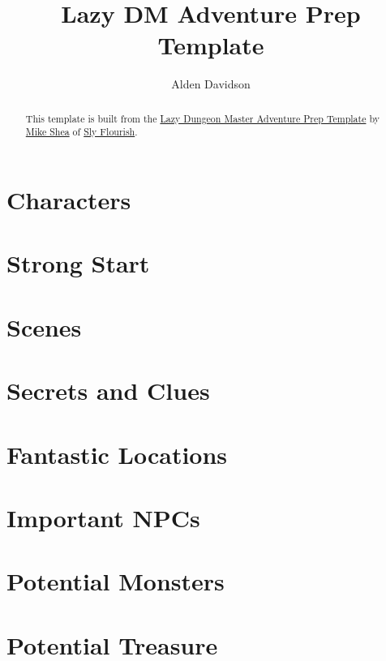\documentclass[a4paper,11pt]{article}
\title{Lazy DM Adventure Prep Template}
\author{Alden Davidson}
\begin{document}
\maketitle
\tableofcontents

\begin{abstract}
  This template is built from the
  \href{https://slyflourish.com/rotldm_template.html}{Lazy Dungeon Master Adventure Prep Template} by
  \href{https://slyflourish.com/about_mike_shea.html}{Mike Shea} of \href{https://slyflourish.com/}{Sly Flourish}.
\end{abstract}

\pagebreak
\section*{Characters}
\label{sec:Characters}

\pagebreak
\section*{Strong Start}
\label{sec:StrongStart}

\pagebreak
\section*{Scenes}
\label{sec:Scenes}

\pagebreak
\section*{Secrets and Clues}
\label{sec:SecretsAndClues}

\pagebreak
\section*{Fantastic Locations}
\label{sec:FantasticLocations}

\pagebreak
\section*{Important NPCs}
\label{sec:ImportantNPCs}

\pagebreak
\section*{Potential Monsters}
\label{sec:PotentialMonsters}

\pagebreak
\section*{Potential Treasure}
\label{sec:PotentialTreasure}
\end{document}
